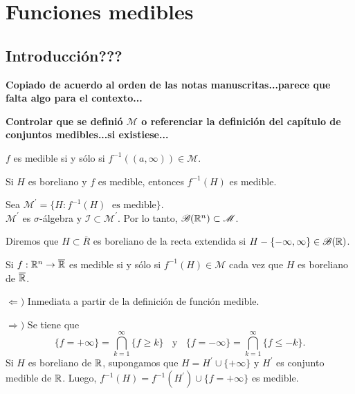 \chapter{Funciones medibles
}

\section{Introducci\'on???}

\textbf{ Copiado de acuerdo al orden de las notas manuscritas...parece que falta algo para el contexto...}

\textbf{Controlar que se defini\'o  $\mathscr{M}$ o referenciar la definici\'on del cap\'itulo  de conjuntos medibles...si existiese...}

\begin{definicion}{}
$f$ es medible si y s\'olo si $f^{-1}((a,\infty)) \in \mathscr{M}$. 
\end{definicion}

\begin{teorema}{}
Si $H$ es boreliano y $f$ es medible, entonces $f^{-1}(H)$ es medible.
\end{teorema}

\begin{demo}{}
Sea $\mathscr{M}^{'}=\{ H: f^{-1}(H)\;\mbox{ es medible}\}$.\\
$\mathscr{M}^{'}$ es $\sigma$-\'algebra y $\mathscr{I}\subset \mathscr{M}^{'}$.
Por lo tanto, $\mathscr{B}(\mathbb{R}^n) \subset \mathscr{M}$.
\end{demo}

\begin{definicion}{}
Diremos que $H \subset \overline{R}$ es boreliano de la recta extendida si $H-\{ -\infty, \infty\} \in \mathscr{B}(\mathbb{R})$.
\end{definicion}

\begin{teorema}{}
Si $f:\mathbb{R}^n \to \overline{\mathbb{R}}$ es medible si y s\'olo si $f^{-1}(H) \in \mathscr{M}$ cada vez que $H$ es boreliano de $\overline{\mathbb{R}}$.
\end{teorema}

\begin{demo}
$\Leftarrow)$ Inmediata a partir de la definici\'on de funci\'on medible.

$\Rightarrow)$ Se tiene que 
\[
\{f=+\infty\}=\bigcap\limits_{k=1}^{\infty} \{f \geq k\}
\;\;\mbox{ y }\;\;
\{f=-\infty\}=\bigcap\limits_{k=1}^{\infty} \{f \leq -k\}.
\]
Si $H$ es boreliano de $\mathbb{R}$, supongamos que $H=H^{'}\cup \{+\infty\}$ y $H^{'}$ es conjunto medible de $\mathbb{R}$.
Luego, $f^{-1}(H)=f^{-1}(H^{'})\cup \{f=+\infty\}$ es medible.
\end{demo}


